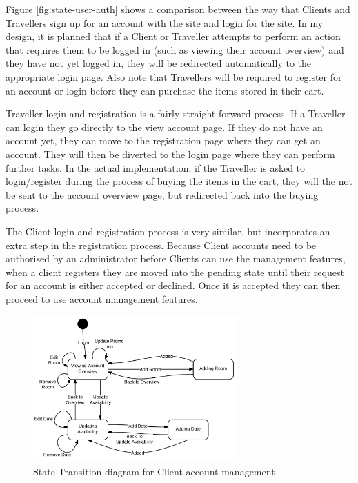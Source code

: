 \documentclass{article}
\begin{document}
Figure \ref{fig:state-user-auth} shows a comparison between the way that Clients and Travellers sign up for an account with the site and login for the site. In my design, it is planned that if a Client or Traveller attempts to perform an action that requires them to be logged in (such as viewing their account overview) and they have not yet logged in, they will be redirected automatically to the appropriate login page. Also note that Travellers will be required to register for an account or login before they can purchase the items stored in their cart.

Traveller login and registration is a fairly straight forward process. If a Traveller can login they go directly to the view account page. If they do not have an account yet, they can move to the registration page where they can get an account. They will then be diverted to the login page where they can perform further tasks. In the actual implementation, if the Traveller is asked to login/register during the process of buying the items in the cart, they will the not be sent to the account overview page, but redirected back into the buying process.

The Client login and registration process is very similar, but incorporates an extra step in the registration process. Because Client accounts need to be authorised by an administrator before Clients can use the management features, when a client registers they are moved into the pending state until their request for an account is either accepted or declined. Once it is accepted they can then proceed to use account management features.

\begin{figure}[H]
\centering
\includegraphics[width=0.7\textwidth]{img/state_diagrams/StateTransitionClientManagement.png}
\caption{State Transition diagram for Client account management}
\label{fig:state-client-manage}
\end{figure}
\end{document}
